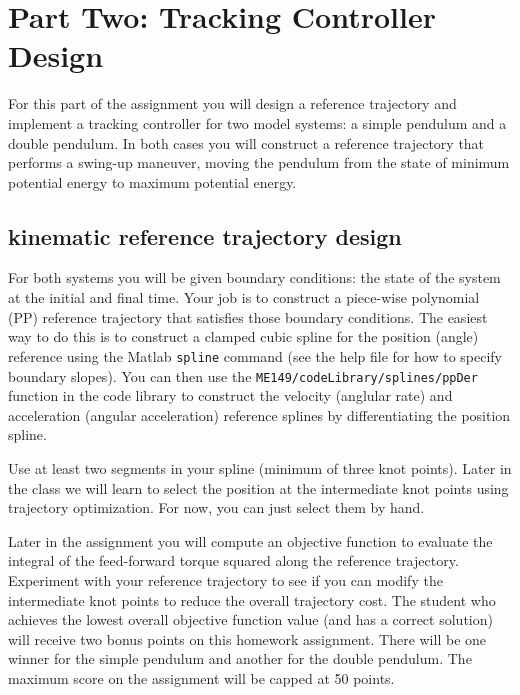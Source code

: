 \section*{Part Two: Tracking Controller Design}

For this part of the assignment you will design a reference trajectory
and implement a tracking controller for two model systems:
a simple pendulum and a double pendulum.
In both cases you will construct a reference trajectory that performs a
swing-up maneuver, moving the pendulum from the state of minimum potential energy
to maximum potential energy.

\subsection*{kinematic reference trajectory design}

For both systems you will be given boundary conditions:
the state of the system at the initial and final time.
Your job is to construct a piece-wise polynomial (PP)
reference trajectory that satisfies those boundary conditions.
The easiest way to do this is to construct a
clamped cubic spline for the position (angle) reference using the
Matlab \texttt{spline} command (see the help file for how to specify boundary slopes).
You can then use the \texttt{ME149/codeLibrary/splines/ppDer} function in the code library
to construct the velocity (anglular rate) and
acceleration (angular acceleration) reference splines
by differentiating the position spline.

\par
Use at least two segments in your spline (minimum of three knot points).
Later in the class we will learn to select the position at the intermediate knot points
using trajectory optimization. For now, you can just select them by hand.

\par
Later in the assignment you will compute an objective function to evaluate the
integral of the feed-forward torque squared along the reference trajectory.
Experiment with your reference trajectory to see if you can modify the intermediate knot
points to reduce the overall trajectory cost.
The student who achieves the lowest overall objective function value (and has a correct solution)
will receive two bonus points on this homework assignment.
There will be one winner for the simple pendulum and another for the double pendulum.
The maximum score on the assignment will be capped at 50 points.

